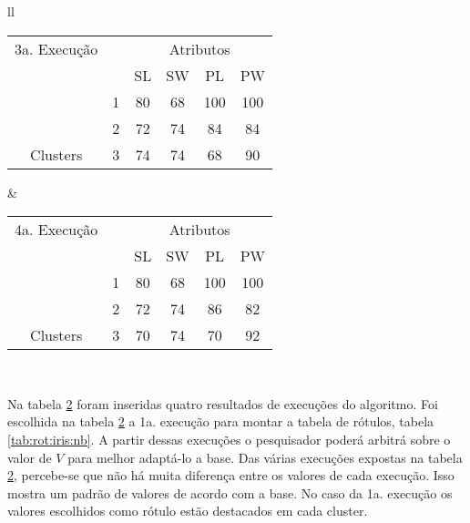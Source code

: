 \begin{table}[!h]
\begin{tabular}{ll}
   \small\addtolength{\tabcolsep}{-1pt}
     \begin{tabular}{|cl|c|c|c|c|}
        \hline \hline
         3a. Execução           &   & \multicolumn{4}{c|}{Atributos}                                               \\ \cline{3-6} 
       \multicolumn{1}{|l}{}                             &   & SL   & SW     & PL    & PW      \\ \hline
        \multicolumn{1}{|c|}{}                           & 1 & 80 & 68   & 100  & 100       \\ \cline{2-6} 
        \multicolumn{1}{|c|}{}                           & 2 & 72 & 74   & 84  &  84    \\ \cline{2-6} 
        \multicolumn{1}{|c|}{\multirow{-3}{*}{Clusters}} & 3 & 74 & 74   & 68  &   90   \\ \hline
      \end{tabular}
    
    &
    
 \small\addtolength{\tabcolsep}{-1pt}
     \begin{tabular}{|cl|c|c|c|c|}
        \hline \hline
        4a. Execução      &   & \multicolumn{4}{c|}{Atributos}                                               \\ \cline{3-6} 
       \multicolumn{1}{|l}{}                             &   & SL   & SW     & PL    & PW      \\ \hline
        \multicolumn{1}{|c|}{}                           & 1 & 80 & 68   & 100  &   100     \\ \cline{2-6} 
        \multicolumn{1}{|c|}{}                           & 2 & 72 & 74   & 86  &   82   \\ \cline{2-6} 
        \multicolumn{1}{|c|}{\multirow{-3}{*}{Clusters}} & 3 & 70 & 74   & 70  & 92     \\ \hline
      \end{tabular}
   \\
 
 \end{tabular}
 \label{tab:execucoes:iris:nb}
\end{table}

Na tabela \ref{tab:execucoes:iris:nb} foram inseridas quatro resultados de execuções do algoritmo. Foi escolhida na tabela \ref{tab:execucoes:iris:nb} a 1a. execução para montar a tabela de rótulos, tabela \ref{tab:rot:iris:nb}. A partir dessas execuções o pesquisador poderá arbitrá sobre o valor de ${V}$ para melhor adaptá-lo a base. Das várias execuções expostas na tabela \ref{tab:execucoes:iris:nb}, percebe-se que não há muita diferença entre os valores de cada execução. Isso mostra um padrão de valores de acordo com a base. No caso da 1a. execução os valores escolhidos como rótulo estão destacados em cada cluster.

